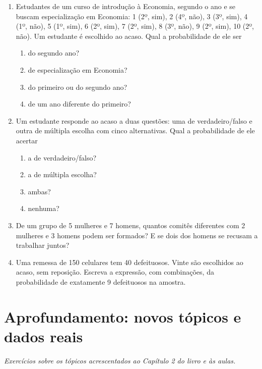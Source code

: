 \documentclass[11pt]{article}
\begin{document}
\begin{enumerate}[label=\textbf{C\arabic*.}, leftmargin=*]
\begin{enumerate}[label=(\alph*)]
\end{enumerate}
\item Estudantes de um curso de introdução à Economia, segundo o ano e se buscam especialização em Economia: 1 (2º, sim), 2 (4º, não), 3 (3º, sim), 4 (1º, não), 5 (1º, sim), 6 (2º, sim), 7 (2º, sim), 8 (3º, não), 9 (2º, sim), 10 (2º, não). Um estudante é escolhido ao acaso. Qual a probabilidade de ele ser
\begin{enumerate}[label=(\alph*)]
  \item do segundo ano?
  \item de especialização em Economia?
  \item do primeiro ou do segundo ano?
  \item de um ano diferente do primeiro?
\end{enumerate}
\item Um estudante responde ao acaso a duas questões: uma de verdadeiro/falso e outra de múltipla escolha com cinco alternativas. Qual a probabilidade de ele acertar
\begin{enumerate}[label=(\alph*)]
  \item a de verdadeiro/falso?
  \item a de múltipla escolha?
  \item ambas?
  \item nenhuma?
\end{enumerate}
\item De um grupo de 5 mulheres e 7 homens, quantos comitês diferentes com 2 mulheres e 3 homens podem ser formados? E se dois dos homens se recusam a trabalhar juntos?
\item Uma remessa de 150 celulares tem 40 defeituosos. Vinte são escolhidos ao acaso, sem reposição. Escreva a expressão, com combinações, da probabilidade de exatamente 9 defeituosos na amostra.

\end{enumerate}

\bigskip
{}
\section*{Aprofundamento: novos tópicos e dados reais}
\noindent\textit{Exercícios sobre os tópicos acrescentados ao Capítulo 2 do livro e às aulas.}
\end{document}
